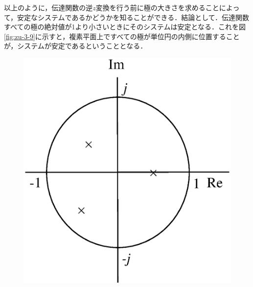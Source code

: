 以上のように，伝達関数の逆$z$変換を行う前に極の大きさを求めることによって，安定なシステムであるかどうかを知ることができる．結論として．伝達関数すべての極の絶対値が1より小さいときにそのシステムは安定となる．これを図\ref{fig:zu-3-9}に示すと，複素平面上ですべての極が単位円の内側に位置することが，システムが安定であるということとなる．

\begin{figure}[H]
\begin{center}
\begin{minipage}{.4\textwidth}
\begin{center}
\includegraphics[width=.95\textwidth]{fig/zu-3-9-a.eps}


\end{center}
\end{minipage}
\end{center}
\end{figure}
